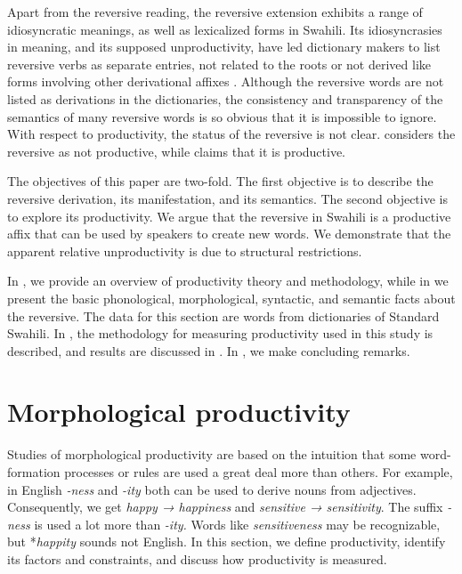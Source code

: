 \documentclass[output=paper]{langsci/langscibook}
\begin{document}
Apart from the reversive reading, the reversive extension exhibits a range of idiosyncratic meanings, as well as lexicalized forms in Swahili. Its idiosyncrasies in meaning, and its supposed unproductivity, have led dictionary makers to list reversive verbs as separate entries, not related to the roots or not derived like forms involving other derivational affixes \citep[for example][]{TUKI2001,TUKI2004,Mdeeetal2009}. Although the reversive words are not listed as derivations in the dictionaries, the consistency and transparency of the semantics of many reversive words is so obvious that it is impossible to ignore. With respect to productivity, the status of the reversive is not clear. \citet{Shepardson1986} considers the reversive as not productive, while \citet{Schadeberg1973} claims that it is productive. 

The objectives of this paper are two-fold. The first objective is to describe the reversive derivation, its manifestation, and its semantics. The second objective is to explore its productivity. We argue that the reversive in Swahili is a productive affix that can be used by speakers to create new words. We demonstrate that the apparent relative unproductivity is due to structural restrictions.

In , we provide an overview of productivity theory and methodology, while in  we present the basic phonological, morphological, syntactic, and semantic facts about the reversive. The data for this section are words from dictionaries of Standard Swahili. In , the methodology for measuring productivity used in this study is described, and results are discussed in . In , we make concluding remarks.

\section{Morphological productivity} \label{sec:ngonyaningowa:2}

Studies of morphological productivity are based on the intuition that some word-formation processes or rules are used a great deal more than others. For example, in English \textit{-ness} and \textit{-ity} both can be used to derive nouns from adjectives. Consequently, we get \textit{happy → happiness} and\textit{ sensitive → sensitivity}. The suffix \textit{-ness} is used a lot more than \textit{-ity.} Words like \textit{sensitiveness} may be recognizable, but *\textit{happity} sounds not English. In this section, we define productivity, identify its factors and constraints, and discuss how productivity is measured. 
\end{document}
